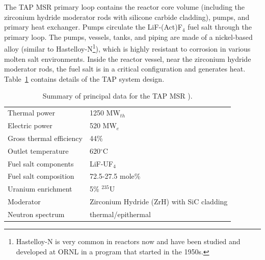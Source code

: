 \documentclass{anstrans}
\begin{document}
The \gls{TAP} \gls{MSR} primary loop contains the reactor core volume 
(including the zirconium hydride moderator rods with silicone carbide 
cladding), pumps, and primary heat exchanger. Pumps circulate the 
LiF-(Act)F$_4$ fuel salt through the primary loop. The pumps, vessels, tanks, 
and piping are made of a nickel-based alloy (similar to Hastelloy-N\footnote{ 
Hastelloy-N  is very common in reactors now and have been studied and 
developed at \gls{ORNL} in a program that started in the 1950s.}), which is 
highly resistant to corrosion in various molten salt environments. Inside the 
reactor vessel, near the zirconium hydride moderator rods, 
the fuel salt is in a critical configuration and generates heat. 
Table~\ref{tab:tap_tab} contains details of the \gls{TAP} system design. 
\begin{table}[h!]
	\caption{Summary of principal data for the \gls{TAP} \gls{MSR} 	
	\cite{transatomic_power_corporation_technical_2016, 
	transatomic_power_corporation_neutronics_2016}). }
	\begin{tabularx}{\linewidth}{X  X }
		\hline
		Thermal power		& 1250 MW$_{th}  $       
		\\ 
		Electric power		& 520 MW$_e  $ 			 
		\\ 
		Gross thermal efficiency 	& 44\%     				 
		\\  
		Outlet temperature			& 620$^{\circ}$C         
		\\ 
		Fuel salt components        & LiF-UF$_4$				 \\  
		Fuel salt composition       & 72.5-27.5 mole\%			 
		\\  
		Uranium enrichment          & 5\% $^{235}$U          	 \\
		Moderator & Zirconium Hydride (ZrH) with SiC 
		cladding \\
		Neutron spectrum						& 
		thermal/epithermal                 \\
		\hline
	\end{tabularx}
	\label{tab:tap_tab}
\end{table}
\end{document}
